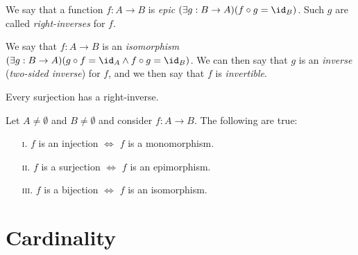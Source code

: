 \begin{definition}[Epimorphisms]
    We say that a function $f: A \to B$ is \emph{epic} \iffbydefn
    $\pn*{\exists g: B \to A}\pn*{f \circ g = \id_{B}}$.
    Such $g$ are called \emph{right-inverses} for $f$.
\end{definition}

\begin{definition}[Isomorphisms]
    We say that $f: A \to B$ is an \emph{isomorphism} \iffbydefn
    $\pn*{\exists g: B \to A}\pn*{g \circ f = \id_{A} \meet f \circ g = \id_{B}}$.
    We can then say that $g$ is an \emph{inverse} (\aka \emph{two-sided inverse}) for $f$,
    and we then say that $f$ is \emph{invertible}.
\end{definition}

\begin{axiom}
    Every surjection has a right-inverse.
\end{axiom}

\begin{theorem}\label{thm:inverse}
    Let $A \neq \emptyset$ and $B \neq \emptyset$ and consider $f: A \to B$.
    The following are true:
    \begin{enumerate}
        \item[\textsc{i.}]
            $f$ is an injection $\iff$ $f$ is a monomorphism.
        \item[\textsc{ii.}]
            $f$ is a surjection $\iff$ $f$ is an epimorphism.
        \item[\textsc{iii.}]
            $f$ is a bijection $\iff$ $f$ is an isomorphism.
    \end{enumerate}
\end{theorem}

\section{Cardinality}

